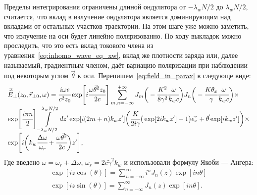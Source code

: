 Пределы интегрирования ограничены длиной ондулятора от $-\lambda_w N/2$ до $\lambda_w N/2$, считается, что вклад в излучение ондулятора является доминирующим над вкладами от остальных участков траектории. На этом шаге уже можно заметить, что излучение на оси будет линейно поляризованно. По ходу выкладок можно проследить, что это есть вклад токового члена из уравнения~\ref{eq:inhomo_wave_eq_xw}, вклад же плотности заряда или, далее называемый, градиентным членом, даёт вариацию поляризации при наблюдении под некоторым углом $\vec{\theta}$ к оси.
Перепишем~\ref{eq:field_in_parax} в следующе виде:
\begin{equation}
		\label{eq:field_in_parax_Bessel}
		\begin{array}{lcl}
			\vec{\widetilde{E}}_{\bot}(z_0,  \vec{r}_{\bot 0}, \omega) =
			\cfrac{i\omega e}{c^2z_0} \exp[i\cfrac{\omega \vec{\theta}^2 z_0}{2c}]
			\displaystyle\sum_{m,n=-\infty}^{+\infty}
			J_m\bigg(-\cfrac{K^2}{8\gamma^2}\cfrac{\omega}{k_w c}\bigg)
			J_n\bigg(-\cfrac{K{\theta_x}}{\gamma}\cfrac{\omega}{k_w c}\bigg)\times\\
			\exp[\cfrac{i\pi n}{2}]
			\displaystyle\int\limits_{-\lambda_w N/2}^{\lambda_w N/2} dz'\exp[i(2m + n)k_wz']
			\bigg(\cfrac{K}{2i\gamma}\big(\exp[2ik_w z'] - 1\big)\vec{e_x} + \vec{\theta}\exp[ik_w z']\bigg)\times\\
			\exp[i\bigg(k_w \cfrac{\Delta\omega}{\omega_r} + 
			\cfrac{\omega\vec{\theta}^2}{2c}\bigg)z'],
		\end{array}	
\end{equation}
Где введено $\omega = \omega_r + \Delta\omega$, $\omega_r = 2c\widetilde{\gamma}^2k_w$ и использовали формулу Якоби — Ангера:
\begin{equation}
	\begin{array}{lcl}
		\exp[iz\cos(\theta)] = 
		\displaystyle\sum\limits_{n =-\infty}^{\infty}
		i^n J_n(z)\exp[in\theta]\\	
		\exp[iz\sin(\theta)] = 
		\displaystyle\sum\limits_{n =-\infty}^{\infty}
		J_n(z)\exp[in\theta].
	\end{array}	
\end{equation}

